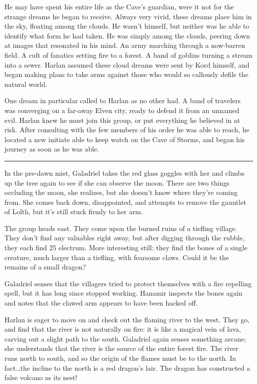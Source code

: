\documentclass[smalldemyvopaper,11pt,twoside,onecolumn,openright,extrafontsizes]{memoir}
\begin{document}
He may have spent his entire life as the Cave's guardian, were it not
for the strange dreams he began to receive. Always very vivid, these
dreams place him in the sky, floating among the clouds. He wasn't
himself, but neither was he able to identify what form he had taken. He
was simply among the clouds, peering down at images that resonated in
his mind. An army marching through a now-barren field. A cult of
fanatics setting fire to a forest. A band of goblins turning a stream
into a sewer. Harlan assumed these cloud dreams were sent by Kord
himself, and began making plans to take arms against those who would so
callously defile the natural world.

One dream in particular called to Harlan as no other had. A band of
travelers was converging on a far-away Elven city, ready to defend it
from an unnamed evil. Harlan knew he must join this group, or put
everything he believed in at risk. After consulting with the few members
of his order he was able to reach, he located a new initiate able to
keep watch on the Cave of Storms, and began his journey as soon as he
was able.

\begin{center}\rule{0.5\linewidth}{\linethickness}\end{center}

In the pre-dawn mist, Galadriel takes the red glass goggles with her and
climbs up the tree again to see if she can observe the moon. There are
two things occluding the moon, she realizes, but she doesn't know where
they're coming from. She comes back down, disappointed, and attempts to
remove the gauntlet of Lolth, but it's still stuck firmly to her arm.

The group heads east. They come upon the burned ruins of a tiefling
village. They don't find any valuables right away, but after digging
through the rubble, they each find 25 electrum. More interesting still:
they find the bones of a single creature, much larger than a tiefling,
with fearsome claws. Could it be the remains of a small dragon?

Galadriel senses that the villagers tried to protect themselves with a
fire repelling spell, but it has long since stopped working. Hanamir
inspects the bones again and notes that the clawed arm appears to have
been hacked off.

Harlan is eager to move on and check out the flaming river to the west.
They go, and find that the river is not naturally on fire: it is like a
magical vein of lava, carving out a slight path to the south. Galadriel
again senses something arcane; she understands that the river is the
source of the entire forest fire. The river runs north to south, and so
the origin of the flames must be to the north. In fact\ldots the incline
to the north is a red dragon's lair. The dragon has constructed a false
volcano as its nest!
\end{document}
